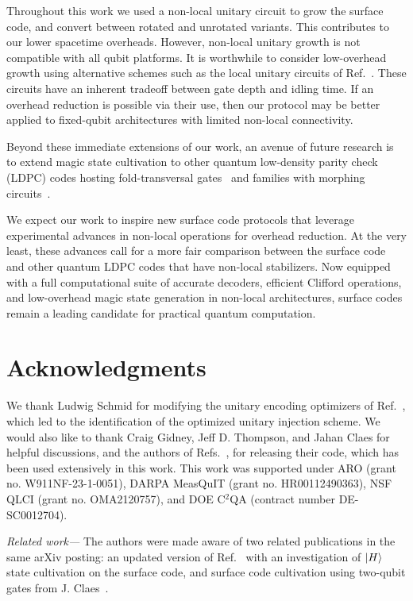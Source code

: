 \documentclass[%
    aps, 
    physrev,
    reprint,
]{revtex4-2}
\begin{document}
Throughout this work we used a non-local unitary circuit to grow the surface code, and convert between rotated and unrotated variants.
This contributes to our lower spacetime overheads. 
However, non-local unitary growth is not compatible with all qubit platforms. 
It is worthwhile to consider low-overhead growth using alternative schemes such as the local unitary circuits of Ref.~\cite{higgott2021optimal,claes2025lowerdepthlocalencodingcircuits}. 
These circuits have an inherent tradeoff between gate depth and idling time. 
If an overhead reduction is possible via their use, then our protocol may be better applied to fixed-qubit architectures with limited non-local connectivity. 

Beyond these immediate extensions of our work, an avenue of future research is to extend magic state cultivation to other quantum low-density parity check (LDPC) codes hosting fold-transversal gates~\cite{breuckmann2024fold} and families with morphing circuits~\cite{shaw2025lowering}.

We expect our work to inspire new surface code protocols that leverage experimental advances in non-local operations for overhead reduction. 
At the very least, these advances call for a more fair comparison between the surface code and other quantum LDPC codes that have non-local stabilizers. 
Now equipped with a full computational suite of accurate decoders, efficient Clifford operations, and low-overhead magic state generation in non-local architectures, surface codes remain a leading candidate for practical quantum computation. 


\section*{Acknowledgments}

We thank Ludwig Schmid for modifying the unitary encoding optimizers of Ref.~\cite{mqt2024}, which led to the identification of the optimized unitary injection scheme. 
We would also like to thank Craig Gidney, Jeff D. Thompson, and Jahan Claes for helpful discussions, and the authors of Refs.~\cite{gidney2023cleaner,gidney2024magic, gidney2025yoked}, for releasing their code, which has been used extensively in this work.
This work was supported under  ARO (grant no. W911NF-23-1-0051),  DARPA MeasQuIT (grant no. HR00112490363), NSF QLCI (grant no. OMA2120757), and DOE C$^2$QA (contract number DE-SC0012704).

\textit{Related work---} 
The authors were made aware of two related publications in the same arXiv posting: an updated version of Ref.~\cite{vaknin2025magic} with an investigation of $\ket{H}$ state cultivation on the surface code, and  surface code cultivation using two-qubit gates from J. Claes~\cite{claes2025cultivatingtstatessurface}.
\end{document}
